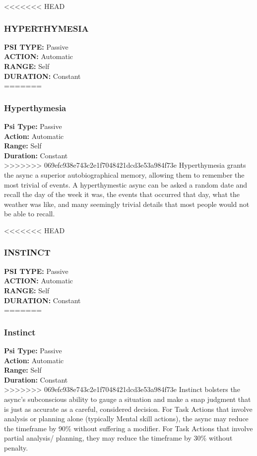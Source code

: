 <<<<<<< HEAD \subsubsection{HYPERTHYMESIA} \textbf{PSI TYPE:} Passive \\ \textbf{ACTION:} Automatic \\ \textbf{RANGE:} Self \\ \textbf{DURATION:} Constant \\ ======= \subsubsection{Hyperthymesia} \textbf{Psi Type:} Passive \\ \textbf{Action:} Automatic \\ \textbf{Range:} Self \\ \textbf{Duration:} Constant \\ >>>>>>> 069efc938e743c2e1f7048421dcd3e53a984f73e Hyperthymesia grants the async a superior autobiographical memory, allowing them to remember the most trivial of events. A hyperthymestic async can be asked a random date and recall the day of the week it was, the events that occurred that day, what the weather was like, and many seemingly trivial details that most people would not be able to recall. 

<<<<<<< HEAD \subsubsection{INSTINCT} \textbf{PSI TYPE:} Passive \\ \textbf{ACTION:} Automatic \\ \textbf{RANGE:} Self \\ \textbf{DURATION:} Constant \\ ======= \subsubsection{Instinct} \textbf{Psi Type:} Passive \\ \textbf{Action:} Automatic \\ \textbf{Range:} Self \\ \textbf{Duration:} Constant \\ >>>>>>> 069efc938e743c2e1f7048421dcd3e53a984f73e Instinct bolsters the async’s subconscious ability to gauge a situation and make a snap judgment that is just as accurate as a careful, considered decision. For Task Actions that involve analysis or planning alone (typically Mental skill actions), the async may reduce the timeframe by 90\% without suffering a modifier. For Task Actions that involve partial analysis/ planning, they may reduce the timeframe by 30\% without penalty. 


